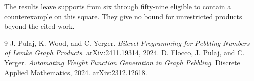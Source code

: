 \documentclass[10pt]{article}
\begin{document}
The results leave supports from six through fifty-nine eligible to
contain a counterexample on this square. They give no bound for
unrestricted products beyond the cited work.

\begin{thebibliography}{9}
J. Pulaj, K. Wood, and C. Yerger.
\emph{Bilevel Programming for Pebbling Numbers of Lemke Graph Products}.
arXiv:2411.19314, 2024.
D. Flocco, J. Pulaj, and C. Yerger.
\emph{Automating Weight Function Generation in Graph Pebbling}.
Discrete Applied Mathematics, 2024. arXiv:2312.12618.
\end{thebibliography}
\end{document}
